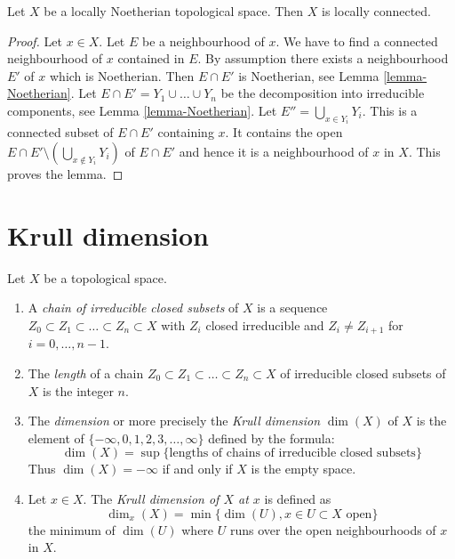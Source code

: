 \begin{lemma}
\label{lemma-locally-Noetherian-locally-connected}
Let $X$ be a locally Noetherian topological space.
Then $X$ is locally connected.
\end{lemma}

\begin{proof}
Let $x \in X$. Let $E$ be a neighbourhood of $x$.
We have to find a connected neighbourhood of $x$ contained
in $E$. By assumption there exists a neighbourhood $E'$ of $x$
which is Noetherian. Then $E \cap E'$ is Noetherian, see
Lemma \ref{lemma-Noetherian}.
Let $E \cap E' = Y_1 \cup \ldots \cup Y_n$ be the decomposition
into irreducible components, see
Lemma \ref{lemma-Noetherian}.
Let $E'' = \bigcup_{x \in Y_i} Y_i$. This is a connected
subset of $E \cap E'$ containing $x$. It contains the open
$E \cap E' \setminus (\bigcup_{x \not \in Y_i} Y_i)$ of $E \cap E'$
and hence it is a neighbourhood of $x$ in $X$. This proves the lemma.
\end{proof}



\section{Krull dimension}
\label{section-krull-dimension}

\begin{definition}
\label{definition-Krull}
Let $X$ be a topological space.
\begin{enumerate}
\item A {\it chain of irreducible closed subsets} of $X$
is a sequence $Z_0 \subset Z_1 \subset \ldots \subset Z_n \subset X$
with $Z_i$ closed irreducible and $Z_i \not= Z_{i + 1}$ for
$i = 0, \ldots, n - 1$.
\item The {\it length} of a chain
$Z_0 \subset Z_1 \subset \ldots \subset Z_n \subset X$
of irreducible closed subsets of $X$ is the
integer $n$.
\item The {\it dimension} or more precisely the {\it Krull dimension}
$\dim(X)$ of $X$ is the element of
$\{-\infty, 0, 1, 2, 3, \ldots, \infty\}$ defined by the formula:
$$
\dim(X) =
\sup \{\text{lengths of chains of irreducible closed subsets}\}
$$
Thus $\dim(X) = -\infty$ if and only if $X$ is the empty space.
\item Let $x \in X$.
The {\it Krull dimension of $X$ at $x$} is defined as
$$
\dim_x(X) = \min \{\dim(U), x\in U\subset X\text{ open}\}
$$
the minimum of $\dim(U)$ where $U$ runs over the open
neighbourhoods of $x$ in $X$.
\end{enumerate}
\end{definition}

